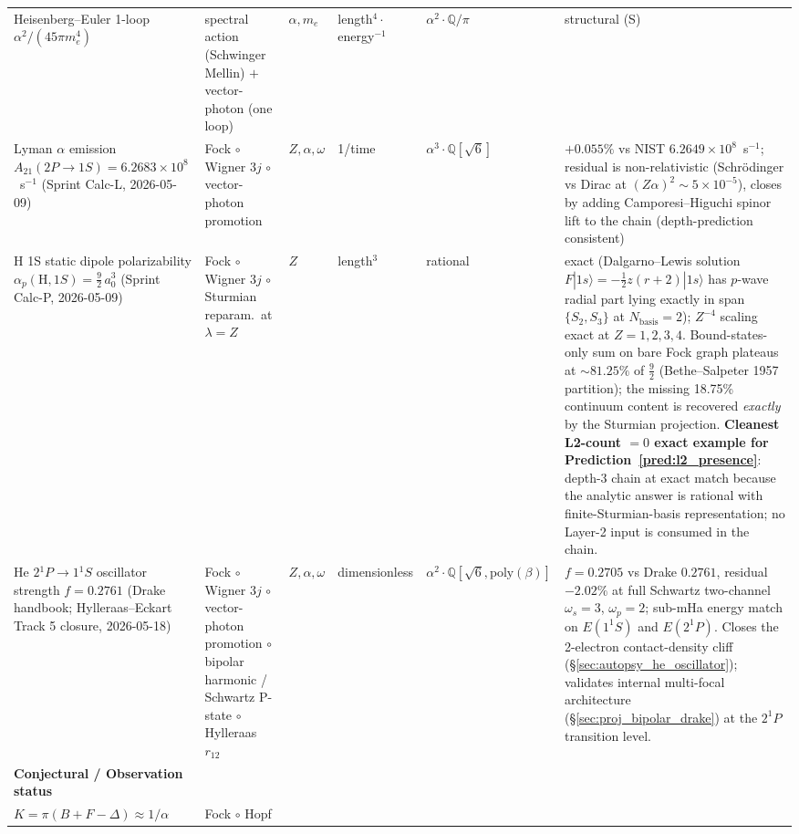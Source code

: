 \documentclass[11pt]{article}
\begin{document}
\begin{longtable}{p{3.5cm} p{2.8cm} p{1.3cm} p{2.2cm} p{1.8cm} p{1.4cm}}
Heisenberg--Euler 1-loop $\alpha^2/(45\pi m_e^4)$ &
spectral action (Schwinger Mellin) $+$ vector-photon (one loop)
& $\alpha, m_e$ & length${}^4 \cdot$ energy${}^{-1}$ &
$\alpha^2 \cdot \mathbb{Q} / \pi$ & structural (S) \\
Lyman $\alpha$ emission $A_{21}(2P{\to}1S) = 6.2683 \times 10^8$~s$^{-1}$
(Sprint Calc-L, 2026-05-09) & Fock $\circ$ Wigner $3j$ $\circ$
vector-photon promotion & $Z, \alpha, \omega$ & 1/time &
$\alpha^3 \cdot \mathbb{Q}[\sqrt{6}]$ & $+0.055\%$ vs NIST
$6.2649 \times 10^8$~s$^{-1}$; residual is non-relativistic
(Schr\"odinger vs Dirac at $(Z\alpha)^2 \sim 5\times 10^{-5}$),
closes by adding Camporesi--Higuchi spinor lift to the chain
(depth-prediction consistent) \\
H 1S static dipole polarizability
$\alpha_p(\text{H}, 1S) = \tfrac{9}{2}\, a_0^3$
(Sprint Calc-P, 2026-05-09) & Fock $\circ$ Wigner $3j$ $\circ$
Sturmian reparam.\ at $\lambda = Z$ & $Z$ & length${}^3$ &
rational & exact (Dalgarno--Lewis solution
$F|1s\rangle = -\tfrac{1}{2} z(r{+}2)|1s\rangle$ has $p$-wave radial
part lying exactly in span$\{S_2, S_3\}$ at $N_\text{basis} = 2$);
$Z^{-4}$ scaling exact at $Z = 1, 2, 3, 4$.  Bound-states-only sum
on bare Fock graph plateaus at $\sim 81.25\%$ of $\tfrac{9}{2}$
(Bethe--Salpeter 1957 partition); the missing 18.75\% continuum
content is recovered \emph{exactly} by the Sturmian projection.
\textbf{Cleanest L2-count $= 0$ exact example for
Prediction~\ref{pred:l2_presence}}: depth-3 chain at exact match
because the analytic answer is rational with finite-Sturmian-basis
representation; no Layer-2 input is consumed in the chain. \\
He $2{}^1P \to 1{}^1\!S$ oscillator strength $f = 0.2761$
(Drake handbook; Hylleraas--Eckart Track 5 closure, 2026-05-18) &
Fock $\circ$ Wigner $3j$ $\circ$ vector-photon promotion $\circ$
bipolar harmonic / Schwartz P-state $\circ$ Hylleraas $r_{12}$ &
$Z, \alpha, \omega$ & dimensionless &
$\alpha^2 \cdot \mathbb{Q}[\sqrt{6}, \mathrm{poly}(\beta)]$ &
$f = 0.2705$ vs Drake $0.2761$, residual $-2.02\%$ at full Schwartz
two-channel $\omega_s = 3$, $\omega_p = 2$; sub-mHa energy match
on $E(1^1S)$ and $E(2^1P)$.  Closes the 2-electron contact-density
cliff (\S\ref{sec:autopsy_he_oscillator}); validates internal
multi-focal architecture (\S\ref{sec:proj_bipolar_drake}) at the
$2^1P$ transition level. \\
\midrule
\textbf{Conjectural / Observation status} & & & & & \\
$K = \pi(B + F - \Delta) \approx 1/\alpha$ & Fock $\circ$ Hopf

\end{longtable}
\end{document}
